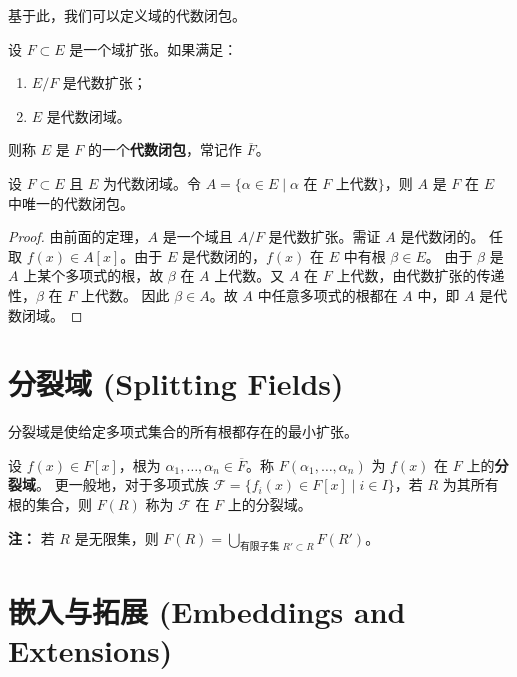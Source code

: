 \documentclass[11pt]{article}
\begin{document}
基于此，我们可以定义域的代数闭包。

\begin{cndefinition}[代数闭包]
    设 $F \subset E$ 是一个域扩张。如果满足：
    \begin{enumerate}
        \item $E/F$ 是代数扩张；
        \item $E$ 是代数闭域。
    \end{enumerate}
    则称 $E$ 是 $F$ 的一个\textbf{代数闭包}，常记作 $\overline{F}$。
\end{cndefinition}

\begin{cntheorem}
    设 $F \subset E$ 且 $E$ 为代数闭域。令 $A = \{\alpha \in E \mid \alpha \text{ 在 } F \text{ 上代数}\}$，则 $A$ 是 $F$ 在 $E$ 中唯一的代数闭包。
\end{cntheorem}

\begin{proof}
    由前面的定理，$A$ 是一个域且 $A/F$ 是代数扩张。需证 $A$ 是代数闭的。
    任取 $f(x) \in A[x]$。由于 $E$ 是代数闭的，$f(x)$ 在 $E$ 中有根 $\beta \in E$。
    由于 $\beta$ 是 $A$ 上某个多项式的根，故 $\beta$ 在 $A$ 上代数。又 $A$ 在 $F$ 上代数，由代数扩张的传递性，$\beta$ 在 $F$ 上代数。
    因此 $\beta \in A$。故 $A$ 中任意多项式的根都在 $A$ 中，即 $A$ 是代数闭域。
\end{proof}

\section{分裂域 (Splitting Fields)}

分裂域是使给定多项式集合的所有根都存在的最小扩张。

\begin{cndefinition}[分裂域]
    设 $f(x) \in F[x]$，根为 $\alpha_1, \dots, \alpha_n \in \overline{F}$。称 $F(\alpha_1, \dots, \alpha_n)$ 为 $f(x)$ 在 $F$ 上的\textbf{分裂域}。
    更一般地，对于多项式族 $\mathcal{F} = \{f_i(x) \in F[x] \mid i \in I\}$，若 $R$ 为其所有根的集合，则 $F(R)$ 称为 $\mathcal{F}$ 在 $F$ 上的分裂域。
\end{cndefinition}

\textbf{注：} 若 $R$ 是无限集，则 $F(R) = \bigcup_{\text{有限子集 } R' \subset R} F(R')$。

\section{嵌入与拓展 (Embeddings and Extensions)}
\end{document}
